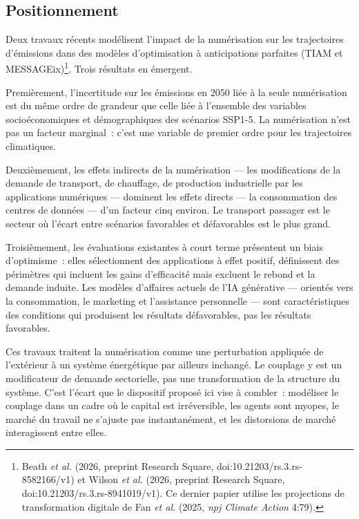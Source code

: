 \subsection{Positionnement}\label{sec:ch4-positionnement}

Deux travaux récents modélisent l'impact de la numérisation sur les trajectoires d'émissions dans des modèles d'optimisation à anticipations parfaites (TIAM et MESSAGEix)\footnote{Beath \emph{et al.} (2026, preprint Research Square, doi:10.21203/rs.3.rs-8582166/v1) et Wilson \emph{et al.} (2026, preprint Research Square, doi:10.21203/rs.3.rs-8941019/v1). Ce dernier papier utilise les projections de transformation digitale de Fan \emph{et al.} (2025, \emph{npj Climate Action} 4:79).}. Trois résultats en émergent.

Premièrement, l'incertitude sur les émissions en 2050 liée à la seule numérisation est du même ordre de grandeur que celle liée à l'ensemble des variables socioéconomiques et démographiques des scénarios SSP1-5. La numérisation n'est pas un facteur marginal~: c'est une variable de premier ordre pour les trajectoires climatiques.

Deuxièmement, les effets indirects de la numérisation --- les modifications de la demande de transport, de chauffage, de production industrielle par les applications numériques --- dominent les effets directs --- la consommation des centres de données --- d'un facteur cinq environ. Le transport passager est le secteur où l'écart entre scénarios favorables et défavorables est le plus grand.

Troisièmement, les évaluations existantes à court terme présentent un biais d'optimisme~: elles sélectionnent des applications à effet positif, définissent des périmètres qui incluent les gains d'efficacité mais excluent le rebond et la demande induite. Les modèles d'affaires actuels de l'IA générative --- orientés vers la consommation, le marketing et l'assistance personnelle --- sont caractéristiques des conditions qui produisent les résultats défavorables, pas les résultats favorables.

Ces travaux traitent la numérisation comme une perturbation appliquée de l'extérieur à un système énergétique par ailleurs inchangé. Le couplage y est un modificateur de demande sectorielle, pas une transformation de la structure du système. C'est l'écart que le dispositif proposé ici vise à combler~: modéliser le couplage dans un cadre où le capital est irréversible, les agents sont myopes, le marché du travail ne s'ajuste pas instantanément, et les distorsions de marché interagissent entre elles.

